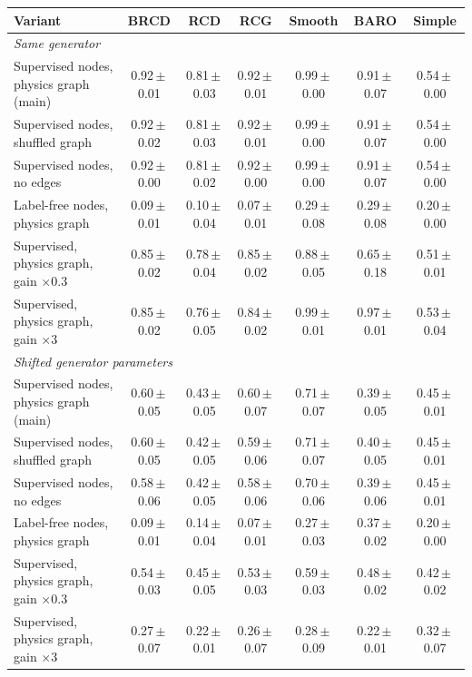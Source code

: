 \begin{tabular}{p{5.6cm}cccccc}
\toprule
Variant & BRCD & RCD & RCG & Smooth & BARO & Simple \\
\midrule
\multicolumn{7}{l}{\textit{Same generator}} \\
\quad Supervised nodes, physics graph (main) & 0.92\,$\pm$\,0.01 & 0.81\,$\pm$\,0.03 & 0.92\,$\pm$\,0.01 & 0.99\,$\pm$\,0.00 & 0.91\,$\pm$\,0.07 & 0.54\,$\pm$\,0.00 \\
\quad Supervised nodes, shuffled graph & 0.92\,$\pm$\,0.02 & 0.81\,$\pm$\,0.03 & 0.92\,$\pm$\,0.01 & 0.99\,$\pm$\,0.00 & 0.91\,$\pm$\,0.07 & 0.54\,$\pm$\,0.00 \\
\quad Supervised nodes, no edges & 0.92\,$\pm$\,0.00 & 0.81\,$\pm$\,0.02 & 0.92\,$\pm$\,0.00 & 0.99\,$\pm$\,0.00 & 0.91\,$\pm$\,0.07 & 0.54\,$\pm$\,0.00 \\
\quad Label-free nodes, physics graph & 0.09\,$\pm$\,0.01 & 0.10\,$\pm$\,0.04 & 0.07\,$\pm$\,0.01 & 0.29\,$\pm$\,0.08 & 0.29\,$\pm$\,0.08 & 0.20\,$\pm$\,0.00 \\
\quad Supervised, physics graph, gain $\times0.3$ & 0.85\,$\pm$\,0.02 & 0.78\,$\pm$\,0.04 & 0.85\,$\pm$\,0.02 & 0.88\,$\pm$\,0.05 & 0.65\,$\pm$\,0.18 & 0.51\,$\pm$\,0.01 \\
\quad Supervised, physics graph, gain $\times3$ & 0.85\,$\pm$\,0.02 & 0.76\,$\pm$\,0.05 & 0.84\,$\pm$\,0.02 & 0.99\,$\pm$\,0.01 & 0.97\,$\pm$\,0.01 & 0.53\,$\pm$\,0.04 \\
\midrule
\multicolumn{7}{l}{\textit{Shifted generator parameters}} \\
\quad Supervised nodes, physics graph (main) & 0.60\,$\pm$\,0.05 & 0.43\,$\pm$\,0.05 & 0.60\,$\pm$\,0.07 & 0.71\,$\pm$\,0.07 & 0.39\,$\pm$\,0.05 & 0.45\,$\pm$\,0.01 \\
\quad Supervised nodes, shuffled graph & 0.60\,$\pm$\,0.05 & 0.42\,$\pm$\,0.05 & 0.59\,$\pm$\,0.06 & 0.71\,$\pm$\,0.07 & 0.40\,$\pm$\,0.05 & 0.45\,$\pm$\,0.01 \\
\quad Supervised nodes, no edges & 0.58\,$\pm$\,0.06 & 0.42\,$\pm$\,0.05 & 0.58\,$\pm$\,0.06 & 0.70\,$\pm$\,0.06 & 0.39\,$\pm$\,0.06 & 0.45\,$\pm$\,0.01 \\
\quad Label-free nodes, physics graph & 0.09\,$\pm$\,0.01 & 0.14\,$\pm$\,0.04 & 0.07\,$\pm$\,0.01 & 0.27\,$\pm$\,0.03 & 0.37\,$\pm$\,0.02 & 0.20\,$\pm$\,0.00 \\
\quad Supervised, physics graph, gain $\times0.3$ & 0.54\,$\pm$\,0.03 & 0.45\,$\pm$\,0.05 & 0.53\,$\pm$\,0.03 & 0.59\,$\pm$\,0.03 & 0.48\,$\pm$\,0.02 & 0.42\,$\pm$\,0.02 \\
\quad Supervised, physics graph, gain $\times3$ & 0.27\,$\pm$\,0.07 & 0.22\,$\pm$\,0.01 & 0.26\,$\pm$\,0.07 & 0.28\,$\pm$\,0.09 & 0.22\,$\pm$\,0.01 & 0.32\,$\pm$\,0.07 \\
\bottomrule
\end{tabular}
